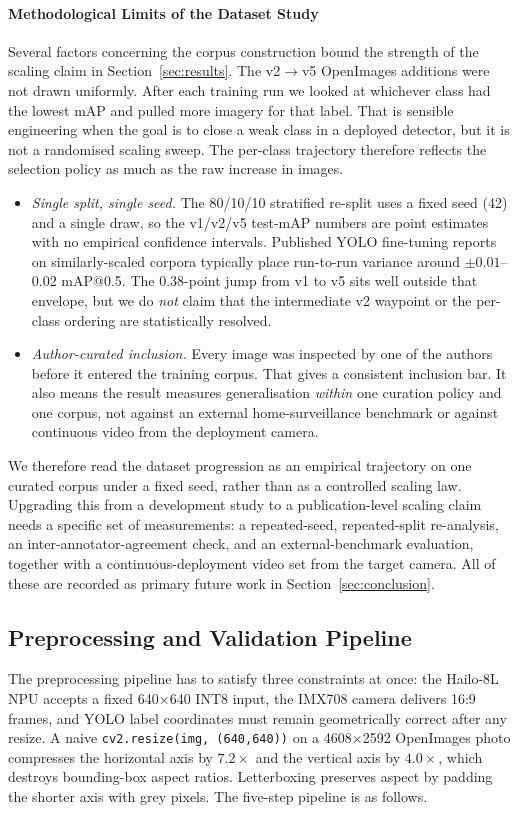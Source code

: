 \documentclass{ieeeaccess}
\begin{document}
\paragraph*{Methodological Limits of the Dataset Study}
\label{sec:dataset_limits}
Several factors concerning the corpus construction bound the strength of the scaling claim in Section~\ref{sec:results}. The v2$\rightarrow$v5 OpenImages additions were not drawn uniformly. After each training run we looked at whichever class had the lowest mAP and pulled more imagery for that label. That is sensible engineering when the goal is to close a weak class in a deployed detector, but it is not a randomised scaling sweep. The per-class trajectory therefore reflects the selection policy as much as the raw increase in images.
\begin{itemize}
\item \emph{Single split, single seed.} The 80/10/10 stratified re-split uses a fixed seed (42) and a single draw, so the v1/v2/v5 test-mAP numbers are point estimates with no empirical confidence intervals. Published YOLO fine-tuning reports on similarly-scaled corpora typically place run-to-run variance around $\pm 0.01$--$0.02$ mAP{@}0.5. The 0.38-point jump from v1 to v5 sits well outside that envelope, but we do \emph{not} claim that the intermediate v2 waypoint or the per-class ordering are statistically resolved.
\item \emph{Author-curated inclusion.} Every image was inspected by one of the authors before it entered the training corpus. That gives a consistent inclusion bar. It also means the result measures generalisation \emph{within} one curation policy and one corpus, not against an external home-surveillance benchmark or against continuous video from the deployment camera.
\end{itemize}
We therefore read the dataset progression as an empirical trajectory on one curated corpus under a fixed seed, rather than as a controlled scaling law. Upgrading this from a development study to a publication-level scaling claim needs a specific set of measurements: a repeated-seed, repeated-split re-analysis, an inter-annotator-agreement check, and an external-benchmark evaluation, together with a continuous-deployment video set from the target camera. All of these are recorded as primary future work in Section~\ref{sec:conclusion}.

\subsection{Preprocessing and Validation Pipeline}
\label{sec:preprocess}
The preprocessing pipeline has to satisfy three constraints at once: the Hailo-8L NPU accepts a fixed 640$\times$640 INT8 input, the IMX708 camera delivers 16:9 frames, and YOLO label coordinates must remain geometrically correct after any resize. A naive \texttt{cv2.resize(img, (640,640))} on a 4608$\times$2592 OpenImages photo compresses the horizontal axis by $7.2\times$ and the vertical axis by $4.0\times$, which destroys bounding-box aspect ratios. Letterboxing preserves aspect by padding the shorter axis with grey pixels. The five-step pipeline is as follows.
\end{document}

